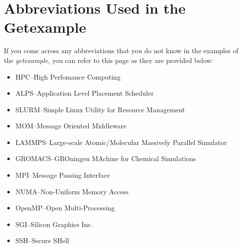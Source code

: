 \section{Abbreviations Used in the Getexample}

If you come across any abbreviations that you do not know in the examples of the \emph{getexample}, you can refer to this page as they are provided 
below: 

\begin{itemize}
\item HPC--High Perfomance Computing
\item ALPS--Application Level Placement Scheduler
\item SLURM--Simple Linux Utility for Resource Management
\item MOM--Message Oriented Middleware
\item LAMMPS--Large-scale Atomic/Molecular Massively Parallel Simulator
\item GROMACS--GROningen MAchine for Chemical Simulations
\item MPI--Message Passing Interface
\item NUMA--Non-Uniform Memory Access
\item OpenMP--Open Multi-Processing
\item SGI--Silicon Graphics Inc.
\item SSH--Secure SHell
\end{itemize}
